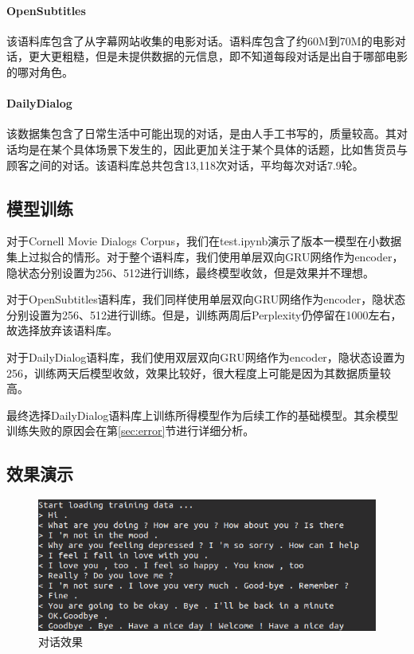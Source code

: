 \documentclass[12pt]{article} %
\begin{document}
\begin{sloppypar}
\paragraph{{\bf OpenSubtitles}~\cite{tiedemann2009news}} 该语料库包含了从字幕网站收集的电影对话。语料库包含了约60M到70M的电影对话，更大更粗糙，但是未提供数据的元信息，即不知道每段对话是出自于哪部电影的哪对角色。

\paragraph{{\bf DailyDialog}~\cite{li2017dailydialog}} 该数据集包含了日常生活中可能出现的对话，是由人手工书写的，质量较高。其对话均是在某个具体场景下发生的，因此更加关注于某个具体的话题，比如售货员与顾客之间的对话。该语料库总共包含13,118次对话，平均每次对话7.9轮。

\subsection{模型训练}

对于Cornell Movie Dialogs Corpus，我们在test.ipynb演示了版本一模型在小数据集上过拟合的情形。对于整个语料库，我们使用单层双向GRU网络作为encoder，隐状态分别设置为256、512进行训练，最终模型收敛，但是效果并不理想。

对于OpenSubtitles语料库，我们同样使用单层双向GRU网络作为encoder，隐状态分别设置为256、512进行训练。但是，训练两周后Perplexity仍停留在1000左右，故选择放弃该语料库。

对于DailyDialog语料库，我们使用双层双向GRU网络作为encoder，隐状态设置为256，训练两天后模型收敛，效果比较好，很大程度上可能是因为其数据质量较高。

最终选择DailyDialog语料库上训练所得模型作为后续工作的基础模型。其余模型训练失败的原因会在第\ref{sec:error}节进行详细分析。

\subsection{效果演示}

\begin{figure}[h]
	\centering
	\includegraphics[width=0.9\linewidth]{figure/conv1.png}
	\caption{对话效果}
	\label{fig:conv}
\end{figure}


\end{sloppypar}
\end{document}
